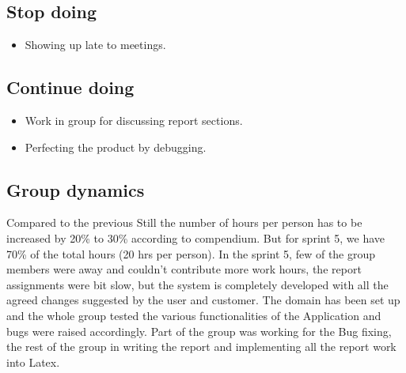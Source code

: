 \subsection{Stop doing}
\label{subsec:S5RetrospectiveStop}
\begin{itemize}
\item Showing up late to meetings. 
\end{itemize}

\subsection{Continue doing}
\label{subsec:S5RetrospectiveContinue}

\begin{itemize}
  \item Work in group for discussing report sections.
  \item Perfecting the product by debugging. 
\end{itemize}

\subsection{Group dynamics}
\label{subsec:S5RetrospectiveDynamics}

Compared to the previous 
Still the number of hours per person has to be increased by 20\% to 30\% according to compendium. But for sprint 5, we have 70\% of the total hours (20 hrs per person).
In the sprint 5, few of the group members were away and couldn’t contribute more work hours, the report assignments were bit slow, but the system is completely developed with all the agreed changes suggested by the user and customer. The domain has been set up and the whole group tested the various functionalities of the Application and bugs were raised accordingly. Part of the group was working for the Bug fixing, the rest of the group in writing the report and implementing all the report work into Latex.

